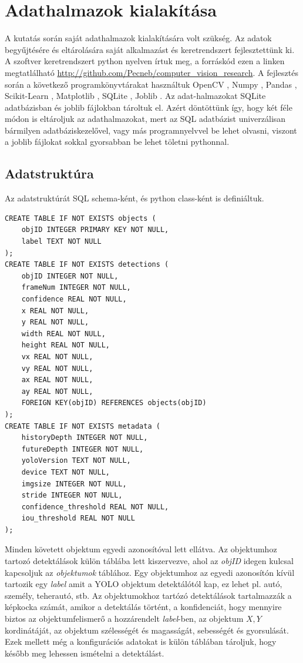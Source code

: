 \documentclass[acmtog, authorversion]{acmart}
\begin{document}
\section{Adathalmazok kialakítása}
A kutatás során saját adathalmazok kialakítására volt szükség. Az adatok begyűjtésére és eltárolására saját alkalmazást és keretrendszert
fejlesztettünk ki. A szoftver keretrendszert python nyelven írtuk meg, a forráskód ezen a linken megtatlálható \url{http://github.com/Pecneb/computer_vision_research}.
A fejlesztés során a következő programkönyvtárakat használtuk OpenCV \cite{opencv_library}, Numpy \cite{harris2020array}, Pandas \cite{reback2020pandas}, 
Scikit-Learn \cite{scikit-learn}, Matplotlib \cite{Hunter:2007}, SQLite \cite{sqlite2020hipp}, Joblib \cite{joblib_library}. Az adat-halmazokat SQLite adatbázisban és
joblib fájlokban tároltuk el. Azért döntöttünk így, hogy két féle módon is eltároljuk az adathalmazokat, mert az SQL adatbázist univerzálisan
bármilyen adatbáziskezelővel, vagy más programnyelvvel be lehet olvasni, viszont a joblib fájlokat sokkal gyorsabban be lehet töletni pythonnal.
\subsection{Adatstruktúra}
Az adatstruktúrát SQL schema-ként, és python class-ként is definiáltuk.
\begin{verbatim}
CREATE TABLE IF NOT EXISTS objects (
    objID INTEGER PRIMARY KEY NOT NULL,
    label TEXT NOT NULL
);
CREATE TABLE IF NOT EXISTS detections (
    objID INTEGER NOT NULL,
    frameNum INTEGER NOT NULL,
    confidence REAL NOT NULL,
    x REAL NOT NULL,
    y REAL NOT NULL,
    width REAL NOT NULL,
    height REAL NOT NULL,
    vx REAL NOT NULL,
    vy REAL NOT NULL,
    ax REAL NOT NULL,
    ay REAL NOT NULL,
    FOREIGN KEY(objID) REFERENCES objects(objID)
);
CREATE TABLE IF NOT EXISTS metadata (
    historyDepth INTEGER NOT NULL,
    futureDepth INTEGER NOT NULL,
    yoloVersion TEXT NOT NULL,   
    device TEXT NOT NULL,
    imgsize INTEGER NOT NULL,
    stride INTEGER NOT NULL,
    confidence_threshold REAL NOT NULL,
    iou_threshold REAL NOT NULL
);
\end{verbatim}
Minden követett objektum egyedi azonosítóval lett ellátva. Az objektumhoz tartozó detektálások külön táblába lett kiszervezve,
ahol az \textit{objID} idegen kulcsal kapcsoljuk az \textit{objektumok} táblához. Egy objektumhoz az egyedi azonosítón kívül
tartozik egy \textit{label} amit a YOLO objektum detektálótól kap, ez lehet pl. autó, személy, teherautó, stb. Az objektumokhoz
tartózó detektálások tartalmazzák a képkocka számát, amikor a detektálás történt, a konfidenciát, hogy mennyire biztos az
objektumfelismerő a hozzárendelt \textit{label}-ben, az objektum \begin{math}X,Y\end{math} kordinátáját, az objektum szélességét
és magasságát, sebességét és gyorsulását. Ezek mellett még a konfigurációs adatokat is külön táblában tároljuk, hogy később meg
lehessen ismételni a detektálást.
\end{document}
